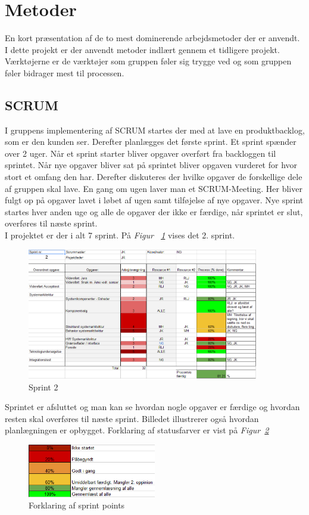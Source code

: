 \section{Metoder}
\label{ch:metoder}
En kort præsentation af de to mest dominerende arbejdsmetoder der er anvendt.\\

I dette projekt er der anvendt metoder indlært gennem et tidligere projekt. Værktøjerne er de værktøjer som gruppen føler sig trygge ved og som gruppen føler bidrager mest til processen. 
\subsection{SCRUM}
I gruppens implementering af SCRUM startes der med at lave en produktbacklog, som er den kunden ser.  Derefter planlægges det første sprint. Et sprint spænder over 2 uger. Når et sprint starter bliver opgaver overført fra backloggen til sprintet. Når nye opgaver bliver sat på sprintet bliver opgaven vurderet for hvor stort et omfang den har. Derefter diskuteres der hvilke opgaver de forskellige dele af gruppen skal lave. En gang om ugen laver man et SCRUM-Meeting. Her bliver fulgt op på opgaver lavet i løbet af ugen samt tilføjelse af nye opgaver. Nye sprint startes hver anden uge og alle de opgaver der ikke er færdige, når sprintet er slut, overføres til næste sprint.\\
I projektet er der i alt 7 sprint. På \textit{Figur ~\ref{fig:SCRUM}} vises det 2. sprint.
\begin{figure}[H]
\centering
\includegraphics[width=0.9\textwidth]{billeder/SCRUM1}
\caption{Sprint 2}
\label{fig:SCRUM}
\end{figure}
Sprintet er afsluttet og man kan se hvordan nogle opgaver er færdige og hvordan resten skal overføres til næste sprint. Billedet illustrerer også hvordan planlægningen er opbygget. Forklaring af statusfarver er vist på \textit{Figur~\ref{fig:SCRUM2}}
\begin{figure}[H]
\centering
\includegraphics[width=0.5\textwidth]{billeder/SCRUM2}
\caption{Forklaring af sprint points}
\label{fig:SCRUM2}
\end{figure}
